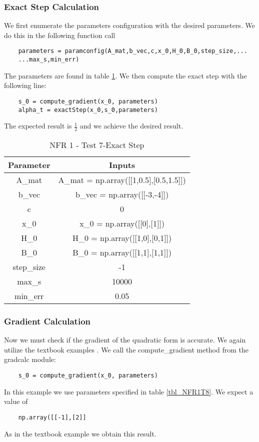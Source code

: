 \documentclass[12pt, titlepage]{article}
\begin{document}
\subsubsection{Exact Step Calculation}

We first enumerate the parameters configuration with the desired parameters. We do this in the following function call 

\begin{lstlisting}
    parameters = paramconfig(A_mat,b_vec,c,x_0,H_0,B_0,step_size,...
    ...max_s,min_err)
\end{lstlisting}
The parameters are found in table \ref{tbl_NFR1T7}. We then compute the exact step with the following line:
\begin{lstlisting}
    s_0 = compute_gradient(x_0, parameters)
    alpha_t = exactStep(x_0,s_0,parameters)
\end{lstlisting}
The expected result is $\frac{1}{2}$ and we achieve the desired result.
\begin{table}[ht]
\caption{NFR 1 - Test 7-Exact Step} \label{tbl_NFR1T7}
\vspace*{2mm}
\centering
 \begin{tabular}{|c|c|} 
 \hline
\textbf{Parameter} & \textbf{Inputs} \\ 
\hline
A\_mat&  A\_mat = np.array([[1,0.5],[0.5,1.5]])   \\
 \hline
 b\_vec& b\_vec = np.array([[-3,-4]])  \\ 
 \hline
 c& 0  \\ 
 \hline
 x\_0& x\_0 = np.array([[0],[1]]) \\ 
 \hline
 H\_0& H\_0 = np.array([[1,0],[0,1]])\\ 
 \hline
 B\_0& B\_0 = np.array([[1,1],[1,1]]) \\ 
 \hline
 step\_size& -1  \\ 
 \hline
 max\_s& 10000 \\ 
 \hline
 min\_err& 0.05  \\ 
 \hline
 
\end{tabular}
\end{table}


\subsubsection{Gradient Calculation}

Now we must check if the gradient of the quadratic form is accurate. We again utilize the textbook examples \citep{Boyd2006}. We call the compute\_gradient method from the gradcalc module:
\begin{lstlisting}
    s_0 = compute_gradient(x_0, parameters)
\end{lstlisting} 
In this example we use parameters specified in table \ref{tbl_NFR1T8}. We expect a value of 
\begin{verbatim}
    np.array([[-1],[2]]
\end{verbatim}
As in the textbook example we obtain this result.
\end{document}
